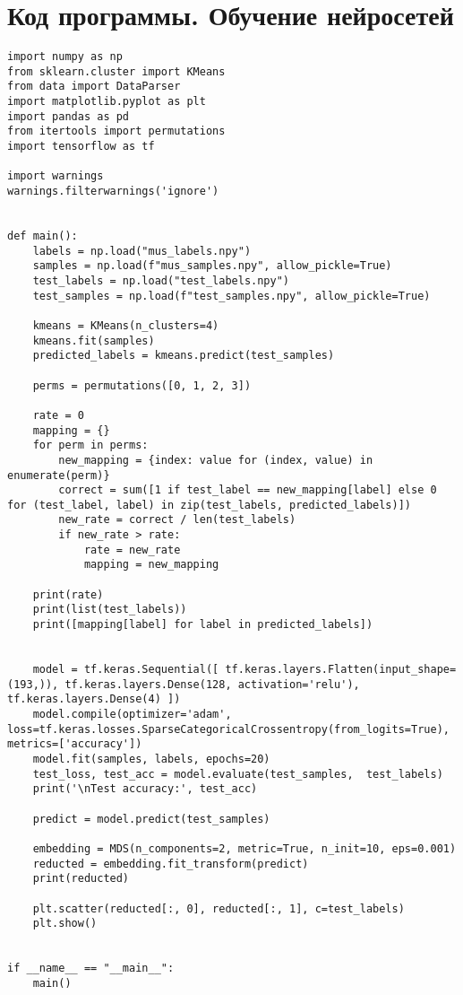 \section*{\centering Код программы. Обучение нейросетей}
\begin{footnotesize}
\begin{lstlisting}
import numpy as np
from sklearn.cluster import KMeans
from data import DataParser
import matplotlib.pyplot as plt
import pandas as pd
from itertools import permutations 
import tensorflow as tf

import warnings
warnings.filterwarnings('ignore')


def main():
    labels = np.load("mus_labels.npy")
    samples = np.load(f"mus_samples.npy", allow_pickle=True)
    test_labels = np.load("test_labels.npy")
    test_samples = np.load(f"test_samples.npy", allow_pickle=True)

    kmeans = KMeans(n_clusters=4)
    kmeans.fit(samples)
    predicted_labels = kmeans.predict(test_samples)

    perms = permutations([0, 1, 2, 3]) 

    rate = 0
    mapping = {}
    for perm in perms:
        new_mapping = {index: value for (index, value) in enumerate(perm)}
        correct = sum([1 if test_label == new_mapping[label] else 0 for (test_label, label) in zip(test_labels, predicted_labels)])
        new_rate = correct / len(test_labels)
        if new_rate > rate:
            rate = new_rate
            mapping = new_mapping

    print(rate)
    print(list(test_labels))
    print([mapping[label] for label in predicted_labels])


    model = tf.keras.Sequential([ tf.keras.layers.Flatten(input_shape=(193,)), tf.keras.layers.Dense(128, activation='relu'), tf.keras.layers.Dense(4) ])
    model.compile(optimizer='adam', loss=tf.keras.losses.SparseCategoricalCrossentropy(from_logits=True), metrics=['accuracy'])
    model.fit(samples, labels, epochs=20)
    test_loss, test_acc = model.evaluate(test_samples,  test_labels)
    print('\nTest accuracy:', test_acc)

    predict = model.predict(test_samples)

    embedding = MDS(n_components=2, metric=True, n_init=10, eps=0.001)
    reducted = embedding.fit_transform(predict)
    print(reducted)

    plt.scatter(reducted[:, 0], reducted[:, 1], c=test_labels)
    plt.show()


if __name__ == "__main__":
    main()
\end{lstlisting}
\end{footnotesize}